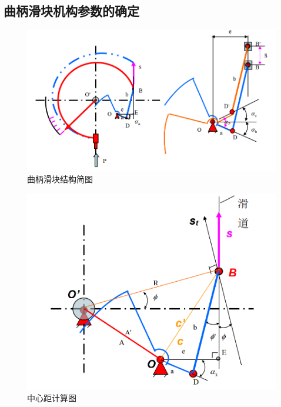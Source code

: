 \subsection{曲柄滑块机构参数的确定}
\begin{figure}[!htbp]
    \centering
    \includegraphics[width =\textwidth]{figures/4.2.1.png}
    \caption{曲柄滑块结构简图}
    \label{FIGURE4.2.1}
\end{figure}
\begin{figure}[!htbp]
    \centering
    \includegraphics[width =\textwidth]{figures/4.2.2.png}
    \caption{中心距计算图}
    \label{FIGURE4.2.2}
\end{figure}
